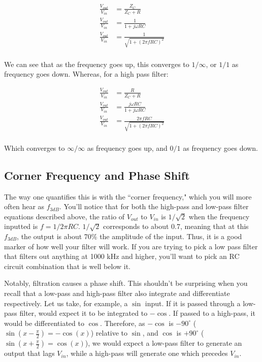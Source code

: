 \documentclass[12pt]{report}
\newcommand{\Vo}{{V}_{out}}
\newcommand{\Vi}{{V}_{in}}
\newcommand{\fdb}{{f}_{3dB}}
\begin{document}
\begin{equation} \label{imp6}
\begin{split}
\frac{\Vo}{\Vi} &= \frac{Z_C}{Z_C + R} \\
\frac{\Vo}{\Vi} &= \frac{1}{1 + j\omega RC} \\
\frac{\Vo}{\Vi} &= \frac{1}{\sqrt{1 + (2\pi f RC)^2}} \\
\end{split}
\end{equation}

We can see that as the frequency goes up, this converges to $1 / \infty$, or $1/1$ as frequency goes down. Whereas, for a high pass filter: 

\begin{equation} \label{imp7}
\begin{split}
\frac{\Vo}{\Vi} &= \frac{R}{Z_C + R} \\
\frac{\Vo}{\Vi} &= \frac{j\omega RC}{1 + j\omega RC} \\
\frac{\Vo}{\Vi} &= \frac{2\pi f RC}{\sqrt{1 + (2\pi f RC)^2}} \\
\end{split}
\end{equation}

Which converges to $\infty / \infty$ as frequency goes up, and $0 / 1$ as frequency goes down.

\subsection{Corner Frequency and Phase Shift}
The way one quantifies this is with the ``corner frequency," which you will more often hear as $\fdb$. You'll notice that for both the high-pass and low-pass filter equations described above, the ratio of $\Vo$ to $\Vi$ is $1/\sqrt{2}$ when the frequency inputted is $f = 1/2\pi RC$. $1/\sqrt{2}$ corresponds to about 0.7, meaning that at this $\fdb$, the output is about 70\% the amplitude of the input. Thus, it is a good marker of how well your filter will work. If you are trying to pick a low pass filter that filters out anything at 1000 kHz and higher, you'll want to pick an RC circuit combination that is well below it.\newline

Notably, filtration causes a phase shift. This shouldn't be surprising when you recall that a low-pass and high-pass filter also integrate and differentiate respectively. Let us take, for example, a $\sin$ input. If it is passed through a low-pass filter, would expect it to be integrated to $-\cos$. If passed to a high-pass, it would be differentiated to $\cos$. Therefore, as $-\cos$ is $-90^{\circ}$ ($\sin(x - \frac{\pi}{2}) = -\cos(x)$) relative to $\sin$, and $\cos$ is $+90^{\circ}$ ($\sin(x + \frac{\pi}{2}) = \cos(x)$), we would expect a low-pass filter to generate an output that lags $\Vi$, while a high-pass will generate one which precedes $\Vi$.\newline
\end{document}
